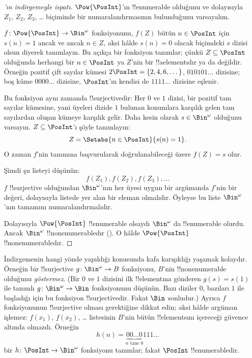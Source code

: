 \documentclass[../../../include/open-logic-section]{subfiles}
\begin{document}
\begin{proof}[{}'ın indirgemeyle ispatı]
$\Pow{\PosInt}$'ın !!{enumerable} olduğunu ve dolayısıyla $Z_1$, $Z_2$,
$Z_3$, \dots{} biçiminde bir numaralandırmasının bulunduğunu varsayalım.

$f\colon\Pow{\PosInt}\to\Bin^\omega$ fonksiyonunu, $f(Z)$ bütün
$n\in\PosInt$ için $s(n)=1$ ancak ve ancak $n\in Z$, aksi hâlde $s(n)=0$
olacak biçimdeki $s$ dizisi olsun diyerek tanımlayın. Bu açıkça bir fonksiyon
tanımlar; çünkü $Z\subseteq\PosInt$ olduğunda herhangi bir $n\in\PosInt$ ya
$Z$'nin bir !!a{element}{}ıdır ya da değildir. Örneğin pozitif çift sayılar
kümesi $2\PosInt=\{2,4,6,\dots\}$, $010101\dots$ dizisine; boş küme
$0000\dots$ dizisine, $\PosInt$'ın kendisi de $1111\dots$ dizisine eşlenir.

Bu fonksiyon aynı zamanda !!{surjective}{}dir: Her $0$ ve $1$ dizisi, bir
pozitif tam sayılar kümesine, yani üyeleri dizide $1$ bulunan konumlara
karşılık gelen tam sayılardan oluşan kümeye karşılık gelir. Daha kesin olarak
$s\in\Bin^\omega$ olduğunu varsayın. $Z\subseteq\PosInt$'ı şöyle tanımlayın:
\[
Z = \Setabs{n \in \PosInt}{s(n) = 1}.
\]
O zaman $f$'nin tanımına başvurularak doğrulanabileceği üzere $f(Z)=s$ olur.

Şimdi şu listeyi düşünün:
\[
f(Z_1), f(Z_2), f(Z_3), \dots
\]
$f$ !!{surjective} olduğundan $\Bin^\omega$'nın her üyesi uygun bir argümanda
$f$'nin bir değeri, dolayısıyla listede yer alan bir eleman olmalıdır.
Öyleyse bu liste $\Bin^\omega$'nın tamamını numaralandırmalıdır.

Dolayısıyla $\Pow{\PosInt}$ !!{enumerable} olsaydı $\Bin^\omega$ da
!!{enumerable} olurdu. Ancak $\Bin^\omega$ !!{nonenumerable}{}dır
(). O hâlde $\Pow{\PosInt}$
!!{nonenumerable}{}dır.
\end{proof}

\begin{explain}
İndirgemenin hangi yönde yapıldığı konusunda kafa karışıklığı yaşamak
kolaydır. Örneğin bir !!{surjective} $g\colon\Bin^\omega\to B$ fonksiyonu,
$B$'nin !!{nonenumerable} olduğunu \emph{göstermez}. (Bir $0$ ve $1$ dizisini
ilk !!{element}{}ına gönderen $g(s)=s(1)$ ile tanımlı $g\colon\Bin^\omega\to
\Bin$ fonksiyonunu düşünün. Bazı diziler $0$, bazıları $1$ ile başladığı için
bu fonksiyon !!{surjective}{}dir. Fakat $\Bin$ sonludur.) Ayrıca $f$
fonksiyonunun !!{surjective} olması gerektiğine dikkat edin; aksi hâlde
argüman işlemez: $f(x_1)$, $f(x_2)$, \dots{} listesinin $B$'nin bütün
!!{element}s{}ını içereceği güvence altında olmazdı. Örneğin
\[
h(n) = \underbrace{00\dots0}_{\text{$n$ tane $0$}}111\dots
\]
bir $h\colon\PosInt\to\Bin^\omega$ fonksiyonu tanımlar; fakat $\PosInt$
!!{enumerable}{}dir.
\end{explain}
\end{document}
